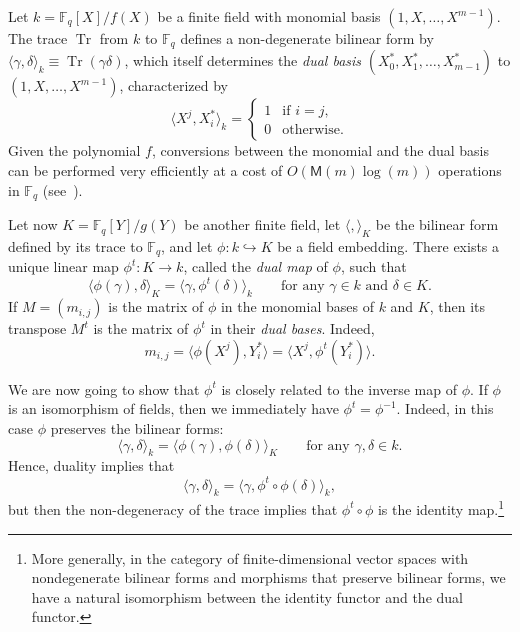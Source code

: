 \documentclass[12pt]{article}
\theoremstyle{plain}
\theoremstyle{definition}
\newcommand{\ang}[1]{\langle#1\rangle}
\DeclareMathOperator{\trace}{Tr} %
\def\F{\ensuremath{\mathbb{F}}}
\def\MM{\ensuremath{\mathsf{M}}}
\begin{document}
Let $k=\F_q[X]/f(X)$ be a finite field with monomial basis
$(1,X,\dots,X^{m-1})$. %
The trace $\trace$ from $k$ to $\F_q$ defines a non-degenerate
bilinear form by
$\ang{\gamma,\delta}_k \equiv \trace(\gamma\delta)$,
which itself determines the \emph{dual basis}
$(X_0^*,X_1^*,\dots,X_{m-1}^*)$ to $(1,X,\dots,X^{m-1})$,
characterized by
\begin{equation*}
  \ang{X^j,X_i^*}_k = \begin{cases}
    1 &\text{if $i=j$,}\\
    0 &\text{otherwise.}
  \end{cases}
\end{equation*}
Given the polynomial $f$, conversions between the monomial and the
dual basis can be performed very efficiently at a cost of
$O(\MM(m)\log(m))$ operations in $\F_q$ (see~\cite[\S~3]{DeDoSc2014}).

Let now $K=\F_q[Y]/g(Y)$ be another finite field, let $\ang{,}_K$ be
the bilinear form defined by its trace to $\F_q$, and let
$\phi:k\hookrightarrow K$ be a field embedding. %
There exists a unique linear map $\phi^t:K\to k$, called the
\emph{dual map} of $\phi$, such that
\begin{equation*}
  \ang{\phi(\gamma),\delta}_K=\ang{\gamma,\phi^t(\delta)}_k
  \qquad\text{for any $\gamma\in k$ and $\delta\in K$.}
\end{equation*}
If $M=(m_{i,j})$ is the matrix of $\phi$ in the monomial bases of $k$
and $K$, then its transpose $M^t$ is the matrix of $\phi^t$ in their
\emph{dual bases}. %
Indeed,
\begin{equation}
  \label{eq:tellegen-matrix}
  m_{i,j} = \ang{\phi(X^j),Y_i^*} = \ang{X^j,\phi^t(Y_i^*)}.
\end{equation}

We are now going to show that $\phi^t$ is closely related to the
inverse map of $\phi$. %
If $\phi$ is an isomorphism of fields, then we immediately have
$\phi^t=\phi^{-1}$. %
Indeed, in this case $\phi$ preserves the bilinear forms:
\begin{equation*}
  \ang{\gamma,\delta}_k = \ang{\phi(\gamma),\phi(\delta)}_K
  \qquad\text{for any $\gamma,\delta\in k$.}
\end{equation*}
Hence, duality implies that
\begin{equation*}
  \ang{\gamma,\delta}_k = \ang{\gamma,\phi^t\circ\phi(\delta)}_k,
\end{equation*}
but then the non-degeneracy of the trace implies that
$\phi^t\circ\phi$ is the identity map.\footnote{More generally, in the
  category of finite-dimensional vector spaces with nondegenerate
  bilinear forms and morphisms that preserve bilinear forms, we have a
  natural isomorphism between the identity functor and the dual
  functor.}
\end{document}
